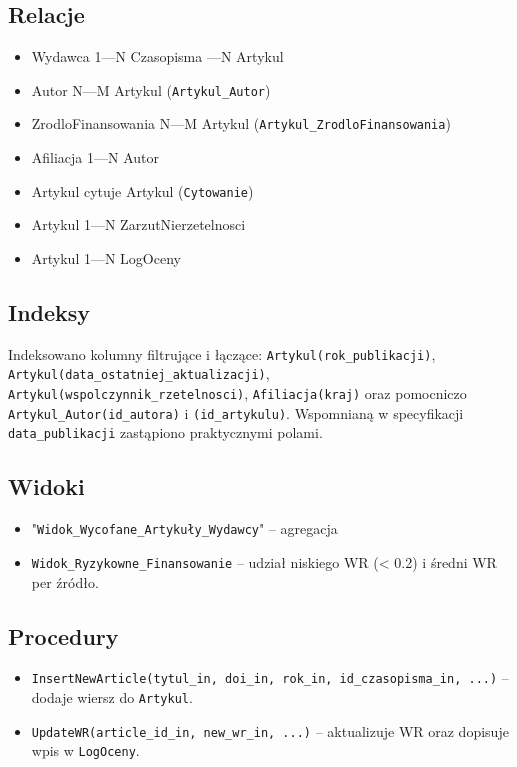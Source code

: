 \documentclass[12pt,a4paper]{article}
\begin{document}
\subsection{Relacje}
\begin{itemize}
  \item Wydawca 1—N Czasopisma —N Artykul
  \item Autor N—M Artykul (\texttt{Artykul\_Autor})
  \item ZrodloFinansowania N—M Artykul (\texttt{Artykul\_ZrodloFinansowania})
  \item Afiliacja 1—N Autor
  \item Artykul cytuje Artykul (\texttt{Cytowanie})
  \item Artykul 1—N ZarzutNierzetelnosci
  \item Artykul 1—N LogOceny
\end{itemize}

\subsection{Indeksy}
Indeksowano kolumny filtrujące i łączące: \texttt{Artykul(rok\_publikacji)}, \texttt{Artykul(data\_ostatniej\_aktualizacji)}, \texttt{Artykul(wspolczynnik\_rzetelnosci)}, \texttt{Afiliacja(kraj)} oraz pomocniczo \texttt{Artykul\_Autor(id\_autora)} i \texttt{(id\_artykulu)}. Wspomnianą w specyfikacji \texttt{data\_publikacji} zastąpiono praktycznymi polami.

\subsection{Widoki}
\begin{itemize}
  \item "\texttt{Widok\_Wycofane\_Artykuły\_Wydawcy}" – agregacja %
  \item \texttt{Widok\_Ryzykowne\_Finansowanie} – udział niskiego WR (< 0.2) i średni WR per źródło.
\end{itemize}

\subsection{Procedury}
\begin{itemize}
  \item \texttt{InsertNewArticle(tytul\_in, doi\_in, rok\_in, id\_czasopisma\_in, ...)} – dodaje wiersz do \texttt{Artykul}.
  \item \texttt{UpdateWR(article\_id\_in, new\_wr\_in, ...)} – aktualizuje WR oraz dopisuje wpis w \texttt{LogOceny}.
\end{itemize}
\end{document}
